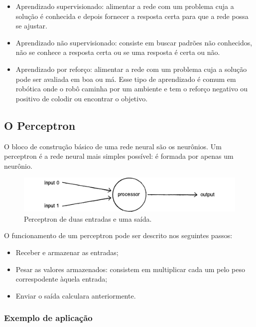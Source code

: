 \begin{itemize}
\item
  Aprendizado supervisionado: alimentar a rede com um problema cuja a solução é conhecida
  e depois fornecer a resposta certa para que a rede possa se ajustar.
\item
  Aprendizado não supervisionado: consiste em buscar padrões não conhecidos, não se conhece
  a resposta certa ou se uma resposta é certa ou não.
\item
  Aprendizado por reforço: alimentar a rede com um problema cuja a solução pode ser avaliada
  em boa ou má. Esse tipo de aprendizado é comum em robótica onde o robô caminha por um ambiente
  e tem o reforço negativo ou positivo de colodir ou encontrar o objetivo.
\end{itemize}

\subsection{O Perceptron}

O bloco de construção básico de uma rede neural são os neurônios. Um perceptron é a rede
neural mais simples possível: é formada por apenas um neurônio.

\begin{figure}[H]
\centering
\includegraphics[width=15cm]{figuras/rede_neural_perceptron}
\caption{Perceptron de duas entradas e uma saída.}\label{fig:rede_neural_perceptron}
\end{figure}


O funcionamento de um perceptron pode ser descrito nos seguintes passos:

\begin{itemize}
\item
  Receber e armazenar as entradas;
\item
  Pesar as valores armazenados: consistem em multiplicar cada um pelo peso correspodente àquela entrada;
\item
  Enviar o saída calculara anteriormente.
\end{itemize}

\subsubsection{Exemplo de aplicação}

